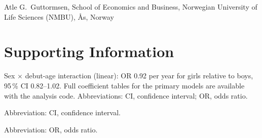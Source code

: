 \documentclass[12pt,a4paper]{article}
\begin{document}

\medskip
\noindent Atle G.\ Guttormsen, School of Economics and Business, Norwegian University of Life Sciences (NMBU), Ås, Norway

\section*{Supporting Information}

\begin{table}[H]
\centering
\caption*{\textbf{Table S1.} Sample flow.}
\small

\end{table}

\begin{table}[H]
\centering
\caption*{\textbf{Table S2.} Senior conversion by debut age and sex (born 2001--2005), \% (Wilson 95\,\% CI).}
\small

\vspace{0.2em}
\parbox{0.8\textwidth}{\footnotesize Sex $\times$ debut-age interaction (linear): OR 0.92 per year for girls relative to boys, 95\,\% CI 0.82--1.02. Full coefficient tables for the primary models are available with the analysis code. Abbreviations: CI, confidence interval; OR, odds ratio.}
\end{table}

\begin{table}[H]
\centering
\caption*{\textbf{Table S3.} Retention $k$ years after the debut season: proportion (Wilson 95\,\% CI). Denominators equal the debut-age n except debut 16 at $k$ = 5 (n = 389).}
\scriptsize

\vspace{0.2em}
\parbox{0.8\textwidth}{\footnotesize Abbreviation: CI, confidence interval.}
\end{table}

\begin{table}[H]
\centering
\caption*{\textbf{Table S4.} Competing at equal career length: proportion with at least two competition days in a single season at least 4, 5 and 6 years after the debut season, by debut age (n = athletes for whom that season was fully observable by 2025), with the adjusted OR per year of later debut (sex, birth cohort, club size).}
\small

\vspace{0.2em}
\parbox{0.8\textwidth}{\footnotesize Abbreviation: OR, odds ratio.}
\end{table}
\end{document}
